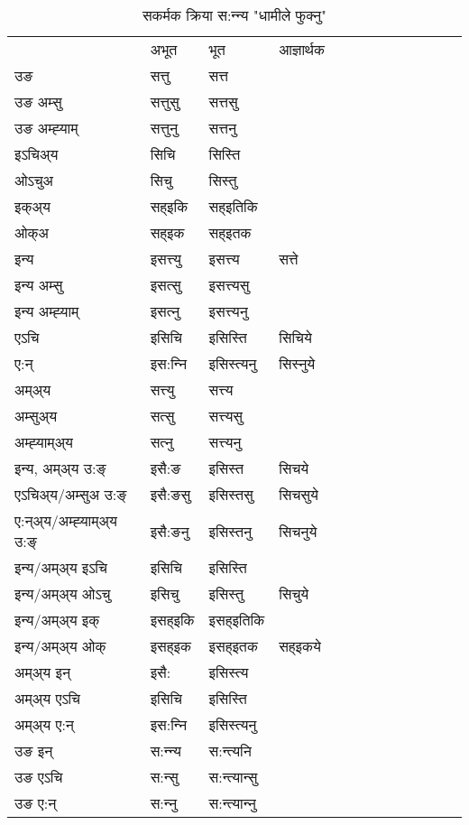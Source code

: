 \begin{table}[H]
\label{itt.vt} \centering
\caption{सकर्मक क्रिया  स:न्‍न्य  "धामीले फुक्नु"  }
\begin{tabular}{l|l|l|l|l|l|l|l|l|l|l|l|l}  \toprule
&अभूत & भूत & आज्ञार्थक \\ 
उङ &सत्तु &सत्त \\ 
उङ अम्सु&सत्तुसु &सत्तसु \\ 
उङ अम्ह्‍याम्&सत्तुनु &सत्तनु \\ 
इऽचिअ्य &सिचि &सिस्ति   \\ 
ओऽचुअ        &सिचु &सिस्तु   \\ 
इक्अ्य&सह्इकि &सह्इतिकि   \\ 
ओक्अ &सह्इक &सह्इतक   \\ 
इन्य & इसत्त्यु  & इसत्त्य &सत्ते  \\ 
इन्य अम्सु& इसत्सु  & इसत्त्यसु   \\ 
इन्य अम्ह्‍याम्& इसत्‍नु  & इसत्त्यनु   \\ 
एऽचि & इसिचि & इसिस्ति &सिचिये    \\ 
ए:न् & इस:न्‍नि  & इसिस्त्यनु &सिस्‍नुये  \\ 
अम्अ्य & सत्त्यु  & सत्त्य  \\ 
अम्सुअ्य & सत्सु & सत्त्यसु  \\ 
अम्ह्‍याम्अ्य & सत्‍नु  & सत्त्यनु \\ 
\midrule
इन्य, अम्अ्य उ:ङ्‌ &इसै:ङ &इसिस्त &सिचये \\ 
एऽचिअ्य/अम्सुअ उ:ङ्‌ &इसै:ङसु &इसिस्तसु &सिचसुये \\ 
ए:न्अ्य/अम्ह्‍याम्अ्य उ:ङ्‌ &इसै:ङनु &इसिस्तनु &सिचनुये \\ 
इन्य/अम्अ्य इऽचि &इसिचि &इसिस्ति    \\ 
इन्य/अम्अ्य ओऽचु &इसिचु &इसिस्तु  &सिचुये  \\ 
इन्य/अम्अ्य इक् &इसह्इकि &इसह्इतिकि   \\ 
इन्य/अम्अ्य ओक् &इसह्इक &इसह्इतक  &सह्इकये  \\ 
अम्अ्य इन् & इसै: & इसिस्त्य   \\ 
अम्अ्य एऽचि & इसिचि & इसिस्ति    \\ 
अम्अ्य ए:न् & इस:न्‍नि  & इसिस्त्यनु  \\ 
\midrule
उङ इन् & स:न्‍न्य  & स:न्त्यनि  \\ 
उङ एऽचि & स:न्सु  & स:न्त्यान्सु   \\ 
उङ ए:न्& स:न्‍नु  & स:न्त्यान्‍नु   \\ 
\bottomrule
\end{tabular}
\end{table}


